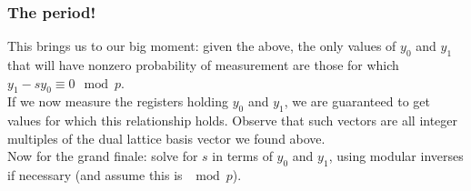 \subsubsection{The period!}
This brings us to our big moment: given the above, the only values of $y_0$ and $y_1$ that will have nonzero probability of measurement are those for which $y_1 -sy_0 \equiv 0 \mod p$. \\

If we now measure the registers holding $y_0$ and $y_1$, we are guaranteed to get values for which this relationship holds. Observe that such vectors are all integer multiples of the dual lattice basis vector we found above. \\

Now for the grand finale: solve for $s$ in terms of $y_0$ and $y_1$, using modular inverses if necessary (and assume this is 
$\mod p$). \\

\noindent{}



